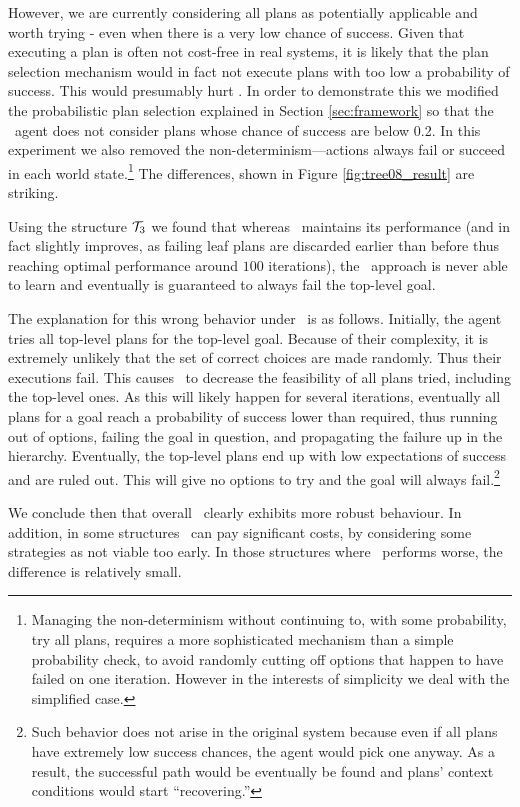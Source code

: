 However, we are currently considering all plans as potentially
applicable and worth trying - even when there is a very low chance of
success. Given that executing a plan is often not cost-free in real
systems, it is likely that the plan selection mechanism would in fact
not execute plans with too low a probability of success. This would
presumably hurt \CL.
% 
In order to demonstrate this we modified the probabilistic plan
selection explained in Section \ref{sec:framework} so that the \JACK\
agent does not consider plans whose chance of success are below 0.2.
In this experiment we also removed the non-determinism---actions
always fail or succeed in each world state.\footnote{Managing the
non-determinism without continuing to, with some probability, try all
plans, requires a more sophisticated mechanism than a simple
probability check, to avoid randomly cutting off options that happen
to have failed on one iteration. However in the interests of
simplicity we deal with the simplified case.}
%
The differences, shown in Figure \ref{fig:tree08_result} are striking.

Using the structure 
${\mathcal{T}}_3$ we  found that whereas \BUL\ maintains its performance (and in
fact slightly improves, as failing leaf plans are discarded earlier
than before thus reaching optimal performance around $100$
iterations), the \CL\ approach is never able to learn and eventually
is guaranteed to always fail the top-level goal.

The explanation for this wrong behavior under \CL\ is as
follows. Initially, the agent tries all top-level plans for the
top-level goal. Because of their complexity, it is extremely unlikely
that the set of correct choices are made randomly. Thus their
executions fail.
This causes \CL\ to decrease the feasibility of all plans
tried, including the top-level ones. As this will likely happen
for several iterations, eventually all plans for a goal reach a probability of
success lower than required, thus
running out of options, failing the goal in question, and propagating
the failure up in the hierarchy. Eventually, the top-level plans end
up with low expectations of success and are ruled out.
This will give no options to try and the goal will always
fail.\footnote{Such behavior does not arise in the original
system because even if all plans have extremely low success chances,
the agent would pick one anyway. As a result, the successful path
would be eventually be found and plans' context conditions would start
``recovering.''}

We conclude then that overall \BUL\ clearly exhibits more robust
behaviour. In addition, in some structures \CL\ can pay significant
costs, by considering some strategies as not viable too early. In
those structures where \BUL\ performs worse, the difference is
relatively small. 

